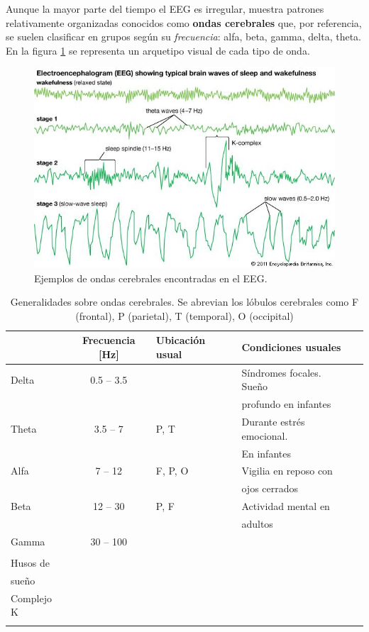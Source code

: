 Aunque la mayor parte del tiempo el EEG es irregular, muestra patrones relativamente organizadas 
conocidos como \textbf{ondas cerebrales} que, por referencia, se suelen clasificar en grupos 
según su \textit{frecuencia}: alfa, beta, gamma, delta, theta.
En la figura \ref{ritmos} se representa un arquetipo visual de cada tipo de onda.

\begin{figure}
\centering
\includegraphics[width=0.9\linewidth]{./img_ejemplos/144177-004-7621DE7D.jpg} 
\caption{Ejemplos de ondas cerebrales encontradas en el EEG. 
}
\label{ritmos}
\end{figure}

\begin{table}
\centering
{\small
\begin{tabular}{lclll}
\toprule
&{Frecuencia [Hz]} & {Ubicación usual} & {Condiciones usuales} \\
\midrule
{Delta} & 0.5 -- 3.5 && Síndromes focales. Sueño \\
&&& profundo en infantes \\
{Theta} & 3.5 -- 7   & P, T & Durante estrés emocional. \\
&&& En infantes \\
{Alfa}  & 7 -- 12    & F, P, O & Vigilia en reposo con \\
&& & ojos cerrados \\
{Beta}  & 12 -- 30   &P, F&      Actividad mental en\\
&&& adultos \\
{Gamma} & 30 -- 100  &&\\
&&& \\
\midrule
{Husos de} &&&\\
sueño &&& \\
{Complejo K} &&&\\
&&& \\
\bottomrule
\end{tabular}
}
\caption{Generalidades sobre ondas cerebrales. Se abrevian los lóbulos cerebrales como
F (frontal), P (parietal), T (temporal), O (occipital)}
\label{tabla_ondas}
\end{table}

